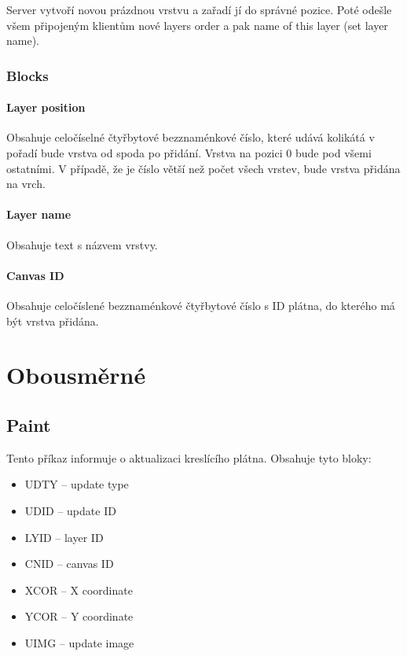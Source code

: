 Server vytvoří novou prázdnou vrstvu a zařadí jí do správné pozice. Poté odešle všem připojeným klientům nové layers order a pak name of this layer (set layer name).

\subsubsection{Blocks}

\paragraph{Layer position}

Obsahuje celočíselné čtyřbytové bezznaménkové číslo, které udává kolikátá v pořadí bude vrstva od spoda po přidání. Vrstva na pozici $0$ bude pod všemi ostatními. V případě, že je číslo větší než počet všech vrstev, bude vrstva přidána na vrch.

\paragraph{Layer name}

Obsahuje text s názvem vrstvy.

\paragraph{Canvas ID}

Obsahuje celočíslené bezznaménkové čtyřbytové číslo s ID plátna, do kterého má být vrstva přidána.

\section{Obousměrné}

\subsection{Paint}

Tento příkaz informuje o aktualizaci kreslícího plátna. Obsahuje tyto bloky:

\begin{itemize}
	\item UDTY -- update type
	\item UDID -- update ID
	\item LYID -- layer ID
	\item CNID -- canvas ID
	\item XCOR -- X coordinate
	\item YCOR -- Y coordinate
	\item UIMG -- update image				
\end{itemize}

